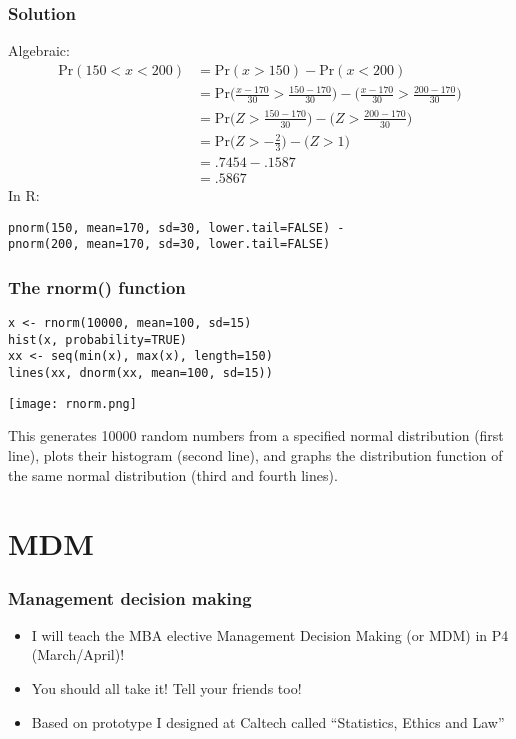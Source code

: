 \documentclass[xcolor=dvipsnames, 9pt]{beamer} %
\begin{document}
\begin{frame}[fragile]
\frametitle{Solution}
Algebraic:
\begin{align*}
\textrm{Pr}(150 < x < 200)
&= \textrm{Pr}(x > 150) - \textrm{Pr}(x < 200) \\
&= \textrm{Pr} \bigg( \frac{x - 170}{30} > \frac{150 - 170}{30} \bigg) - \bigg( \frac{x - 170}{30} > \frac{200 - 170}{30} \bigg) \\
&= \textrm{Pr} \bigg( Z > \frac{150 - 170}{30} \bigg) - \bigg( Z > \frac{200 - 170}{30} \bigg) \\
&= \textrm{Pr} \bigg( Z > -\frac{2}{3} \bigg) - \bigg( Z > 1 \bigg) \\
&= .7454 - .1587 \\
&= .5867
\end{align*}
In \textsf{R}: 
\begin{verbatim}
pnorm(150, mean=170, sd=30, lower.tail=FALSE) - 
pnorm(200, mean=170, sd=30, lower.tail=FALSE)
\end{verbatim}
\end{frame}

\begin{frame}[fragile]
\frametitle{The rnorm() function}
\begin{verbatim}
x <- rnorm(10000, mean=100, sd=15)
hist(x, probability=TRUE)
xx <- seq(min(x), max(x), length=150)
lines(xx, dnorm(xx, mean=100, sd=15))
\end{verbatim}
\begin{center}
\texttt{[image: rnorm.png]}
\end{center}
This generates 10000 random numbers from a specified normal distribution (first line), plots their histogram (second line), and graphs the distribution function of the same normal distribution (third and fourth lines).
\end{frame}

\section{MDM}

\begin{frame}
\frametitle{Management decision making}

\begin{itemize}
\item I will teach the MBA elective Management Decision Making (or MDM) in P4 (March/April)!
\item You should all take it! Tell your friends too!
\item Based on prototype I designed at Caltech called ``Statistics, Ethics and Law''
\end{itemize}
\end{frame}
\end{document}
